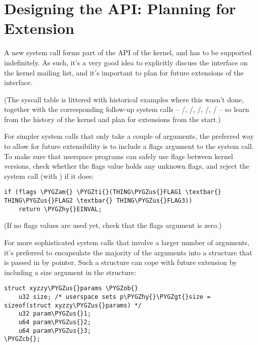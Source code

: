 \documentclass[a4paper,8pt,english]{sphinxmanual}
\def\PYGZus{\char`\_}
\def\PYGZob{\char`\{}
\def\PYGZcb{\char`\}}
\def\PYGZam{\char`\&}
\def\PYGZgt{\char`\>}
\def\PYGZhy{\char`\-}
\def\PYGZti{\char`\~}
\begin{document}
\section{Designing the API: Planning for Extension}
\label{process/adding-syscalls:designing-the-api-planning-for-extension}
A new system call forms part of the API of the kernel, and has to be supported
indefinitely.  As such, it's a very good idea to explicitly discuss the
interface on the kernel mailing list, and it's important to plan for future
extensions of the interface.

(The syscall table is littered with historical examples where this wasn't done,
together with the corresponding follow-up system calls --
/, /, /,
/, / -- so
learn from the history of the kernel and plan for extensions from the start.)

For simpler system calls that only take a couple of arguments, the preferred
way to allow for future extensibility is to include a flags argument to the
system call.  To make sure that userspace programs can safely use flags
between kernel versions, check whether the flags value holds any unknown
flags, and reject the system call (with ) if it does:

\begin{Verbatim}[commandchars=\\\{\}]
if (flags \PYGZam{} \PYGZti{}(THING\PYGZus{}FLAG1 \textbar{} THING\PYGZus{}FLAG2 \textbar{} THING\PYGZus{}FLAG3))
    return \PYGZhy{}EINVAL;
\end{Verbatim}

(If no flags values are used yet, check that the flags argument is zero.)

For more sophisticated system calls that involve a larger number of arguments,
it's preferred to encapsulate the majority of the arguments into a structure
that is passed in by pointer.  Such a structure can cope with future extension
by including a size argument in the structure:

\begin{Verbatim}[commandchars=\\\{\}]
struct xyzzy\PYGZus{}params \PYGZob{}
    u32 size; /* userspace sets p\PYGZhy{}\PYGZgt{}size = sizeof(struct xyzzy\PYGZus{}params) */
    u32 param\PYGZus{}1;
    u64 param\PYGZus{}2;
    u64 param\PYGZus{}3;
\PYGZcb{};
\end{Verbatim}
\end{document}
